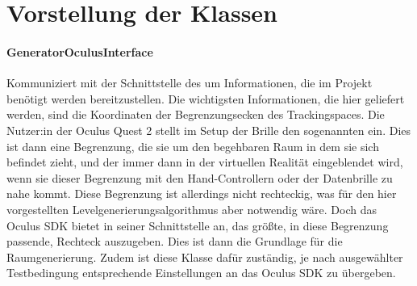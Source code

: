 \section{Vorstellung der Klassen}
\begin{multicols*}{2}
    \paragraph{GeneratorOculusInterface}
    Kommuniziert mit der Schnittstelle des  um Informationen, die im Projekt benötigt werden bereitzustellen. Die wichtigsten Informationen, die hier geliefert werden, sind die Koordinaten der Begrenzungsecken des Trackingspaces. Die Nutzer:in der Oculus Quest 2 stellt im Setup der Brille den sogenannten  ein. Dies ist dann eine Begrenzung, die sie um den begehbaren Raum in dem sie sich befindet zieht, und der immer dann in der virtuellen Realität eingeblendet wird, wenn sie dieser Begrenzung mit den Hand-Controllern oder der Datenbrille zu nahe kommt. Diese Begrenzung ist allerdings nicht rechteckig, was für den hier vorgestellten Levelgenerierungsalgorithmus aber notwendig wäre. Doch das Oculus SDK bietet in seiner Schnittstelle an, das größte, in diese Begrenzung passende, Rechteck auszugeben. Dies ist dann die Grundlage für die Raumgenerierung. Zudem ist diese Klasse dafür zuständig, je nach ausgewählter Testbedingung entsprechende Einstellungen an das Oculus SDK zu übergeben.


\end{multicols*}
